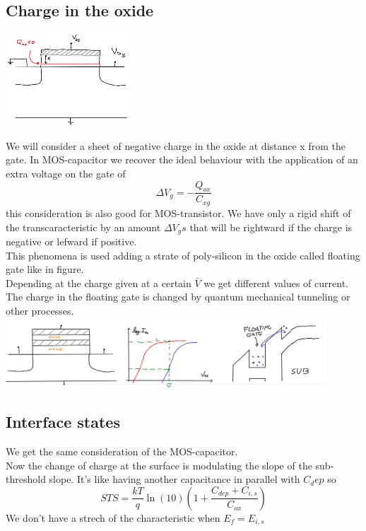 \subsection{Charge in the oxide}

\centering
\includegraphics[width=0.35\textwidth]{qox.png}\\
\raggedright

We will consider a sheet of negative charge in the oxide at distance x from the gate. In MOS-capacitor we recover the ideal behaviour with the application of an extra voltage on the gate of 
\begin{equation}
\Delta V_g=-\frac{Q_{ox}}{C_{xg}}
\end{equation}
this consideration is also good for MOS-transistor. We have only a rigid shift of the transcaracteristic by an amount $\Delta V_gs$ that will be rightward if the charge is negative or lefward if positive.\\
This phenomena is used adding a strate of poly-silicon in the oxide called floating gate like in figure.\\
Depending at the charge given at a certain $\overline{V}$ we get different values of current. The charge in the floating gate is changed by quantum mechanical tunneling or other processes.\\

\centering
\includegraphics[width=0.9\textwidth]{flatinggate.png}\\
\raggedright


\subsection{Interface states}
We get the same consideration of the MOS-capacitor.\\
Now the change of charge at the surface is modulating the slope of the sub-threshold slope. It's like having another capacitance in parallel with $C_dep$ so
\begin{equation}
STS=\frac{kT}{q}\ln(10)\left(1+\frac{C_{dep}+C_{i,s}}{C_{ox}}\right)
\end{equation}
We don't have a strech of the characteristic when $E_f=E_{i,s}$

